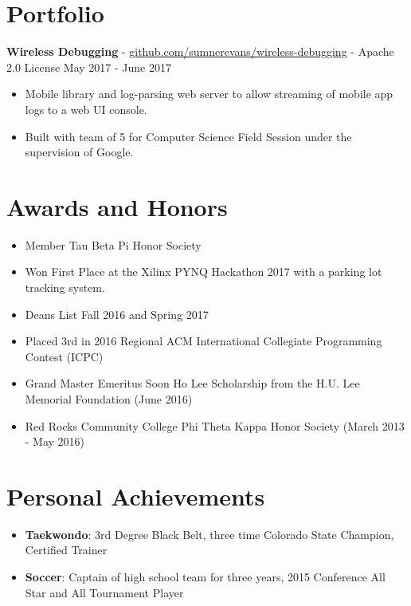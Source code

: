 \documentclass[10pt,letterpaper]{article}
\begin{document}
\section*{Portfolio}
\textbf{Wireless Debugging} -
\href{https://github.com/sumnerevans/wireless-debugging}{github.com/sumnerevans/wireless-debugging}
- Apache 2.0 License \hfill May 2017 - June 2017
\begin{itemize}
    \item Mobile library and log-parsing web server to allow streaming of mobile app
        logs to a web UI console.
    \item Built with team of 5 for Computer Science Field Session under the
        supervision of Google.
\end{itemize}

\section*{Awards and Honors}
\begin{itemize}
    \item Member Tau Beta Pi Honor Society
    \item Won First Place at the Xilinx PYNQ Hackathon 2017 with a parking lot
        tracking system.
    \item Deans List Fall 2016 and Spring 2017
    \item Placed 3rd in 2016 Regional ACM International Collegiate Programming
        Contest (ICPC)
    \item Grand Master Emeritus Soon Ho Lee Scholarship from the H.U. Lee
        Memorial Foundation (June 2016)
    \item Red Rocks Community College Phi Theta Kappa Honor Society (March 2013
        - May 2016)
\end{itemize}

\section*{Personal Achievements}
\begin{itemize}
    \item \textbf{Taekwondo}: 3rd Degree Black Belt, three time Colorado State
        Champion, Certified Trainer
    \item \textbf{Soccer}: Captain of high school team for three years, 2015
        Conference All Star and All Tournament Player
\end{itemize}
\end{document}
